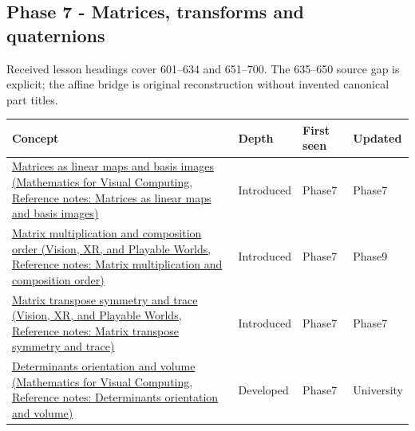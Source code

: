 \subsection{Phase 7 - Matrices, transforms and quaternions}\label{appendix-a6d556a4ef50-phase-7---matrices-transforms-and-quaternions}

Received lesson headings cover 601--634 and 651--700. The 635--650 source gap is explicit; the affine bridge is original reconstruction without invented canonical part titles.

{\def\LTcaptype{none} %
\begin{longtable}[]{@{}
  >{\raggedright\arraybackslash}p{}
  >{\raggedright\arraybackslash}p{}
  >{\raggedright\arraybackslash}p{}
  >{\raggedright\arraybackslash}p{}@{}}
\toprule\noalign{}
\begin{minipage}[b]{\linewidth}\raggedright
Concept
\end{minipage} & \begin{minipage}[b]{\linewidth}\raggedright
Depth
\end{minipage} & \begin{minipage}[b]{\linewidth}\raggedright
First seen
\end{minipage} & \begin{minipage}[b]{\linewidth}\raggedright
Updated
\end{minipage} \\
\midrule\noalign{}
\endhead
\bottomrule\noalign{}
\endlastfoot
\href{../02-Mathematics-for-Visual-Computing/main.pdf\#nameddest=appendix-bd39c3bf5d64}{Matrices as linear maps and basis images (Mathematics for Visual Computing, Reference notes: Matrices as linear maps and basis images)} & Introduced & Phase7 & Phase7 \\
\href{../07-Vision-XR-and-Playable-Worlds/main.pdf\#nameddest=appendix-ab31ef447dbf}{Matrix multiplication and composition order (Vision, XR, and Playable Worlds, Reference notes: Matrix multiplication and composition order)} & Introduced & Phase7 & Phase9 \\
\href{../07-Vision-XR-and-Playable-Worlds/main.pdf\#nameddest=appendix-175ca5ff874d}{Matrix transpose symmetry and trace (Vision, XR, and Playable Worlds, Reference notes: Matrix transpose symmetry and trace)} & Introduced & Phase7 & Phase7 \\
\href{../02-Mathematics-for-Visual-Computing/main.pdf\#nameddest=appendix-da478be01d02}{Determinants orientation and volume (Mathematics for Visual Computing, Reference notes: Determinants orientation and volume)} & Developed & Phase7 & University \\

\end{longtable}}
